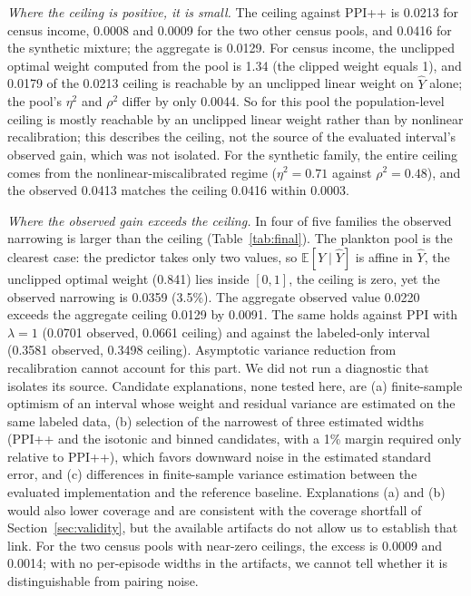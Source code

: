 \documentclass{article}
\newcommand{\Yhat}{\hat Y}
\newcommand{\E}{\mathbb{E}}
\begin{document}
\emph{Where the ceiling is positive, it is small.} The ceiling against PPI++ is 0.0213 for census income, 0.0008 and 0.0009 for the two other census pools, and 0.0416 for the synthetic mixture; the aggregate is 0.0129. %
For census income, the unclipped optimal weight computed from the pool is 1.34 (the clipped weight equals 1), and 0.0179 of the 0.0213 ceiling is reachable by an unclipped linear weight on $\Yhat$ alone; the pool's $\eta^2$ and $\rho^2$ differ by only 0.0044. %
So for this pool the population-level ceiling is mostly reachable by an unclipped linear weight rather than by nonlinear recalibration; this describes the ceiling, not the source of the evaluated interval's observed gain, which was not isolated. For the synthetic family, the entire ceiling comes from the nonlinear-miscalibrated regime ($\eta^2=0.71$ against $\rho^2=0.48$), and the observed 0.0413 matches the ceiling 0.0416 within 0.0003. %

\emph{Where the observed gain exceeds the ceiling.} In four of five families the observed narrowing is larger than the ceiling (Table~\ref{tab:final}). The plankton pool is the clearest case: the predictor takes only two values, so $\E[Y\mid\Yhat]$ is affine in $\Yhat$, the unclipped optimal weight (0.841) lies inside $[0,1]$, the ceiling is zero, yet the observed narrowing is 0.0359 (3.5\%). %
The aggregate observed value 0.0220 exceeds the aggregate ceiling 0.0129 by 0.0091. The same holds against PPI with $\lambda{=}1$ (0.0701 observed, 0.0661 ceiling) and against the labeled-only interval (0.3581 observed, 0.3498 ceiling). %
Asymptotic variance reduction from recalibration cannot account for this part. We did not run a diagnostic that isolates its source. Candidate explanations, none tested here, are (a) finite-sample optimism of an interval whose weight and residual variance are estimated on the same labeled data, (b) selection of the narrowest of three estimated widths (PPI++ and the isotonic and binned candidates, with a 1\% margin required only relative to PPI++), which favors downward noise in the estimated standard error, and (c) differences in finite-sample variance estimation between the evaluated implementation and the reference baseline. Explanations (a) and (b) would also lower coverage and are consistent with the coverage shortfall of Section~\ref{sec:validity}, but the available artifacts do not allow us to establish that link. For the two census pools with near-zero ceilings, the excess is 0.0009 and 0.0014; with no per-episode widths in the artifacts, we cannot tell whether it is distinguishable from pairing noise.
\end{document}
